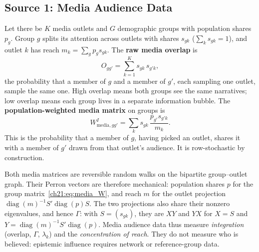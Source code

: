 \documentclass[../structural_economics_book.tex]{subfiles}
\begin{document}
\subsection{Source 1: Media Audience Data}

\begin{definition}\label{ch21:def:media_WI}
Let there be $K$ media outlets and $G$ demographic groups with population shares $p_g$. Group $g$ splits its attention across outlets with shares $s_{gk}$ ($\sum_k s_{gk} = 1$), and outlet $k$ has reach $m_k = \sum_g p_g s_{gk}$. The \textbf{raw media overlap} is
\begin{equation}\label{ch21:eq:media_WI}
O_{gg'} = \sum_{k=1}^K s_{gk}\, s_{g'k},
\end{equation}
the probability that a member of $g$ and a member of $g'$, each sampling one outlet, sample the same one. High overlap means both groups see the same narratives; low overlap means each group lives in a separate information bubble. The \textbf{population-weighted media matrix} on groups is
\begin{equation}\label{ch21:eq:media_W}
W^I_{\text{media}, gg'} = \sum_k s_{gk}\,\frac{p_{g'}s_{g'k}}{m_k}.
\end{equation}
This is the probability that a member of $g$, having picked an outlet, shares it with a member of $g'$ drawn from that outlet's audience. It is row-stochastic by construction.
\end{definition}

Both media matrices are reversible random walks on the bipartite group--outlet graph. Their Perron vectors are therefore mechanical: population shares $p$ for the group matrix~\eqref{ch21:eq:media_W}, and reach $m$ for the outlet projection $\operatorname{diag}(m)^{-1}S'\operatorname{diag}(p)S$. The two projections also share their nonzero eigenvalues, and hence $\Gamma$: with $S = (s_{gk})$, they are $XY$ and $YX$ for $X = S$ and $Y = \operatorname{diag}(m)^{-1}S'\operatorname{diag}(p)$. Media audience data thus measure \emph{integration} (overlap, $\Gamma$, $\lambda_k$) and the \emph{concentration of reach}. They do not measure who is believed: epistemic influence requires network or reference-group data.
\end{document}
